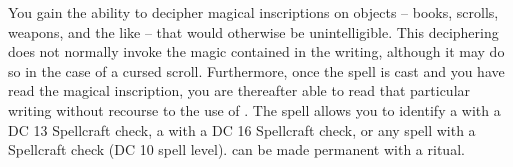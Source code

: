 \spelldur{\durlong}
\spelleffect You gain the ability to decipher magical inscriptions on objects -- books, scrolls, weapons, and the like -- that would otherwise be unintelligible. This deciphering does not normally invoke the magic contained in the writing, although it may do so in the case of a cursed scroll. Furthermore, once the spell is cast and you have read the magical inscription, you are thereafter able to read that particular writing without recourse to the use of . The spell allows you to identify a  with a DC 13 Spellcraft check, a  with a DC 16 Spellcraft check, or any  spell with a Spellcraft check (DC 10 \add spell level).
\spellnotes {} can be made permanent with a  ritual.

